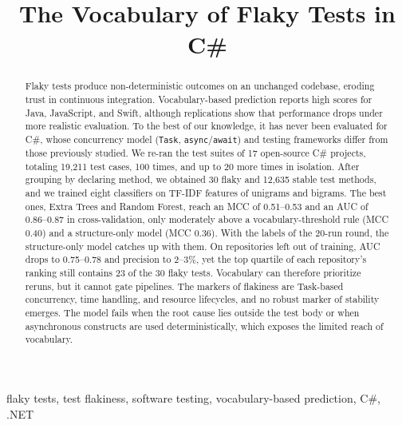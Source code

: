 \documentclass[10pt,conference]{IEEEtran}
\begin{document}
\title{The Vocabulary of Flaky Tests in C\#}

\author{
}

\maketitle

\begin{abstract}
Flaky tests produce non-deterministic outcomes on an unchanged codebase, eroding trust in continuous integration. Vocabulary-based prediction reports high scores for Java, JavaScript, and Swift, although replications show that performance drops under more realistic evaluation. To the best of our knowledge, it has never been evaluated for C\#, whose concurrency model (\texttt{Task}, \texttt{async}/\texttt{await}) and testing frameworks differ from those previously studied. We re-ran the test suites of 17 open-source C\# projects, totaling 19,211 test cases, 100 times, and up to 20 more times in isolation. After grouping by declaring method, we obtained 30 flaky and 12,635 stable test methods, and we trained eight classifiers on TF-IDF features of unigrams and bigrams. The best ones, Extra Trees and Random Forest, reach an MCC of 0.51--0.53 and an AUC of 0.86--0.87 in cross-validation, only moderately above a vocabulary-threshold rule (MCC 0.40) and a structure-only model (MCC 0.36). With the labels of the 20-run round, the structure-only model catches up with them. On repositories left out of training, AUC drops to 0.75--0.78 and precision to 2--3\%, yet the top quartile of each repository's ranking still contains 23 of the 30 flaky tests. Vocabulary can therefore prioritize reruns, but it cannot gate pipelines. The markers of flakiness are Task-based concurrency, time handling, and resource lifecycles, and no robust marker of stability emerges. The model fails when the root cause lies outside the test body or when asynchronous constructs are used deterministically, which exposes the limited reach of vocabulary. 
\end{abstract}

\begin{IEEEkeywords}
flaky tests, test flakiness, software testing, vocabulary-based prediction, C\#, .NET
\end{IEEEkeywords}
\end{document}
